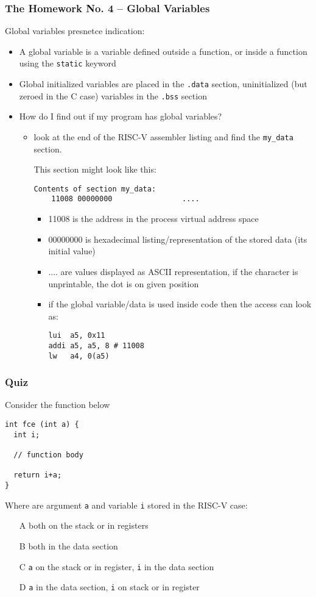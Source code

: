 \documentclass{beamer}
\begin{document}
\begin{frame}[fragile,shrink=5]
\frametitle{The Homework No. 4 -- Global Variables}

Global variables presnetce indication:
\begin{itemize}
\item A global variable is a variable defined outside a function, or inside a function using the \texttt{static} keyword
\item Global initialized variables are placed in the \texttt{.data} section, uninitialized (but zeroed in the C case) variables in the \texttt{.bss} section
\item How do I find out if my program has global variables?
\begin{itemize}
\item look at the end of the RISC-V assembler listing and find the \texttt{my\_data} section.

This section might look like this:

\begin{verbatim}
Contents of section my_data:
    11008 00000000                ....
\end{verbatim}
\begin{itemize}
 \item 11008 is the address in the process virtual address space
 \item 00000000 is hexadecimal listing/representation of the stored data (its initial value)
 \item .... are values displayed as ASCII representation, if the character is unprintable, the dot is on given position
 \item if the global variable/data is used inside code then the access can look as:
\begin{verbatim}
lui  a5, 0x11
addi a5, a5, 8 # 11008
lw   a4, 0(a5)
\end{verbatim}
 \end{itemize}
 \end{itemize}
 \end{itemize}
\end{frame}


\begin{frame}[fragile]
\frametitle{Quiz}

Consider the function below
\begin{verbatim}
int fce (int a) {
  int i;
  
  // function body
  
  return i+a;
}
\end{verbatim}
Where are argument \texttt{a} and variable \texttt{i} stored in the RISC-V case:
\begin{itemize}
 \item[A] both on the stack or in registers
 \item[B] both in the data section
 \item[C] \texttt{a} on the stack or in register, \texttt{i} in the data section
 \item[D] \texttt{a} in the data section, \texttt{i} on stack or in register
\end{itemize}
\end{frame}
\end{document}
